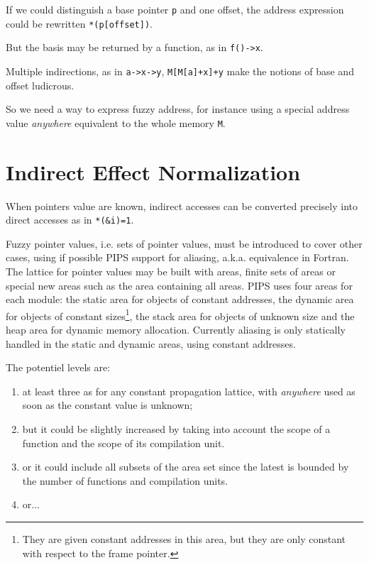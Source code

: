 \documentclass[a4paper]{report}
\begin{document}
If we could distinguish a base pointer \verb/p/ and one offset, the address
 expression could be rewritten \verb/*(p[offset])/.

But the basis may be returned by a function, as in \verb/f()->x/.

Multiple indirections, as in \verb/a->x->y/, \verb/M[M[a]+x]+y/ make
 the notions of base and offset ludicrous.

So we need a way to express fuzzy address, for instance using a
 special address value {\em anywhere} equivalent to the whole memory
 \verb/M/.

\section{Indirect Effect Normalization}

When pointers value are known, indirect accesses can be converted
 precisely into direct accesses as in \verb/*(&i)=1/.

Fuzzy pointer values, i.e. sets of pointer values, must be introduced
 to cover other cases, using if possible PIPS support for aliasing,
 a.k.a. equivalence in Fortran. The lattice for pointer values may be
 built with areas, finite sets of areas or special new areas such as
 the area containing all areas. PIPS uses four areas for each module:
 the static area for objects of constant addresses, the dynamic area
 for objects of constant sizes\footnote{They are given constant
 addresses in this area, but they are only constant with respect to
 the frame pointer.}, the stack area for objects of unknown size and
 the heap area for dynamic memory allocation. Currently aliasing is
 only statically handled in the static and dynamic areas, using
 constant addresses.

The potentiel levels are:
\begin{enumerate}

\item at least three as for any constant propagation lattice, with
 {\em anywhere} used as soon as the constant value is unknown;

\item but it could be slightly increased by taking into account the
 scope of a function and the scope of its compilation unit.

\item or it could include all subsets of the area set since the latest
 is bounded by the number of functions and compilation units.

\item or...

\end{enumerate}
\end{document}
